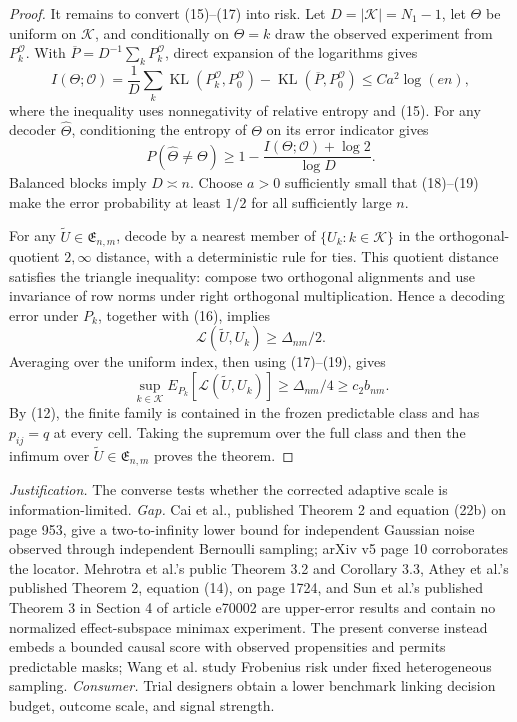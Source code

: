 \documentclass{article}
\begin{document}
\begin{proof}
It remains to convert (15)--(17) into risk.  Let \(D=|\mathcal K|=N_1-1\), let \(\Theta\) be uniform on \(\mathcal K\), and conditionally on \(\Theta=k\) draw the observed experiment from \(P_k^{\mathcal O}\).  With \(\overline P=D^{-1}\sum_kP_k^{\mathcal O}\), direct expansion of the logarithms gives
\[
 I(\Theta;\mathcal O)
 =\frac1D\sum_k\operatorname{KL}(P_k^{\mathcal O},P_0^{\mathcal O})
  -\operatorname{KL}(\overline P,P_0^{\mathcal O})
 \le Ca^2\log(en),
 \tag{18}
\]
where the inequality uses nonnegativity of relative entropy and (15).  For any decoder \(\widehat\Theta\), conditioning the entropy of \(\Theta\) on its error indicator gives
\[
 P(\widehat\Theta\ne\Theta)
 \ge1-\frac{I(\Theta;\mathcal O)+\log2}{\log D}.
 \tag{19}
\]
Balanced blocks imply \(D\asymp n\).  Choose \(a>0\) sufficiently small that (18)--(19) make the error probability at least \(1/2\) for all sufficiently large \(n\).

For any \(\widetilde U\in\mathfrak E_{n,m}\), decode by a nearest member of \(\{U_k:k\in\mathcal K\}\) in the orthogonal-quotient \(2,\infty\) distance, with a deterministic rule for ties.  This quotient distance satisfies the triangle inequality: compose two orthogonal alignments and use invariance of row norms under right orthogonal multiplication.  Hence a decoding error under \(P_k\), together with (16), implies
\[
 \mathcal L(\widetilde U,U_k)\ge\Delta_{nm}/2.
\]
Averaging over the uniform index, then using (17)--(19), gives
\[
 \sup_{k\in\mathcal K}E_{P_k}[\mathcal L(\widetilde U,U_k)]
 \ge\Delta_{nm}/4\ge c_2b_{nm}.
\]
By (12), the finite family is contained in the frozen predictable class and has \(p_{ij}=q\) at every cell.  Taking the supremum over the full class and then the infimum over \(\widetilde U\in\mathfrak E_{n,m}\) proves the theorem.
\end{proof}
\par\smallskip\noindent \textit{Justification.} The converse tests whether the corrected adaptive scale is information-limited. \textit{Gap.} Cai et al., published Theorem 2 and equation (22b) on page 953, give a two-to-infinity lower bound for independent Gaussian noise observed through independent Bernoulli sampling; arXiv v5 page 10 corroborates the locator. Mehrotra et al.'s public Theorem 3.2 and Corollary 3.3, Athey et al.'s published Theorem 2, equation (14), on page 1724, and Sun et al.'s published Theorem 3 in Section 4 of article e70002 are upper-error results and contain no normalized effect-subspace minimax experiment. The present converse instead embeds a bounded causal score with observed propensities and permits predictable masks; Wang et al. study Frobenius risk under fixed heterogeneous sampling. \textit{Consumer.} Trial designers obtain a lower benchmark linking decision budget, outcome scale, and signal strength.
\end{document}
